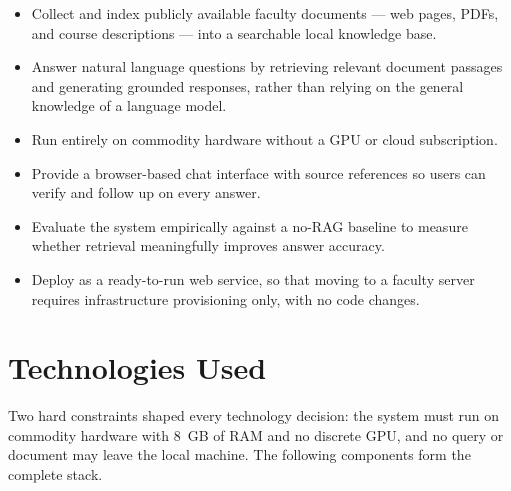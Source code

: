 \begin{itemize}
  \item Collect and index publicly available faculty documents --- web pages,
    PDFs, and course descriptions --- into a searchable local knowledge base.

  \item Answer natural language questions by retrieving relevant document
    passages and generating grounded responses, rather than relying on the
    general knowledge of a language model.

  \item Run entirely on commodity hardware without a GPU or cloud
    subscription.

  \item Provide a browser-based chat interface with source references so
    users can verify and follow up on every answer.

  \item Evaluate the system empirically against a no-RAG baseline to measure
    whether retrieval meaningfully improves answer accuracy.

  \item Deploy as a ready-to-run web service, so that moving to a faculty
    server requires infrastructure provisioning only, with no code changes.
\end{itemize}

\section{Technologies Used}
\label{sec:intro-technologies}

Two hard constraints shaped every technology decision: the system must run
on commodity hardware with 8~GB of RAM and no discrete GPU, and no query or
document may leave the local machine. The following components form the
complete stack.

